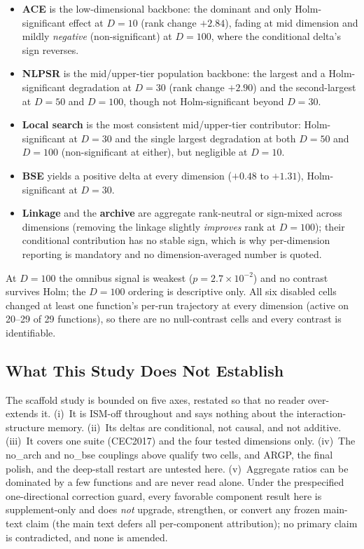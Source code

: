 \documentclass[algorithms,article,submit,moreauthors,pdftex]{Definitions/mdpi}
\begin{document}
\begin{itemize}
\item \textbf{ACE} is the low-dimensional backbone: the dominant and only
Holm-significant effect at $D=10$ (rank change $+2.84$), fading at mid
dimension and mildly \emph{negative} (non-significant) at $D=100$, where the
conditional delta's sign reverses.
\item \textbf{NLPSR} is the mid/upper-tier population backbone: the
largest and a Holm-significant degradation at $D=30$ (rank change $+2.90$)
and the second-largest at $D=50$ and $D=100$, though not Holm-significant
beyond $D=30$.
\item \textbf{Local search} is the most consistent mid/upper-tier
contributor: Holm-significant at $D=30$ and the single largest
degradation at both $D=50$ and $D=100$ (non-significant at either), but
negligible at $D=10$.
\item \textbf{BSE} yields a positive delta at every dimension ($+0.48$
to $+1.31$), Holm-significant at $D=30$.
\item \textbf{Linkage} and the \textbf{archive} are aggregate rank-neutral or
sign-mixed across dimensions (removing the linkage slightly \emph{improves}
rank at $D=100$); their conditional contribution has no stable sign, which is
why per-dimension reporting is mandatory and no dimension-averaged number is
quoted.
\end{itemize}

At $D=100$ the omnibus signal is weakest ($p = 2.7\times10^{-2}$) and
no contrast survives Holm; the $D=100$ ordering is descriptive only.  All six
disabled cells changed at least one function's per-run trajectory at every
dimension (active on 20--29 of 29 functions), so there are no null-contrast
cells and every contrast is identifiable.

\subsection{What This Study Does Not Establish}\label{sec:supp:ablation:limits}

The scaffold study is bounded on five axes, restated so that no reader
over-extends it.  (i)~It is ISM-off throughout and says nothing about the
interaction-structure memory.  (ii)~Its deltas are conditional, not causal,
and not additive.  (iii)~It covers one suite (CEC2017) and the four tested
dimensions only.  (iv)~The no\_arch and no\_bse couplings
above qualify two cells, and ARGP, the final polish, and the deep-stall
restart are untested here.  (v)~Aggregate ratios can be dominated by a few
functions and are never read alone.  Under the prespecified one-directional
correction guard, every favorable component result here is supplement-only and
does \emph{not} upgrade, strengthen, or convert any frozen main-text claim
(the main text defers all per-component attribution); no primary claim is
contradicted, and none is amended.
\end{document}
